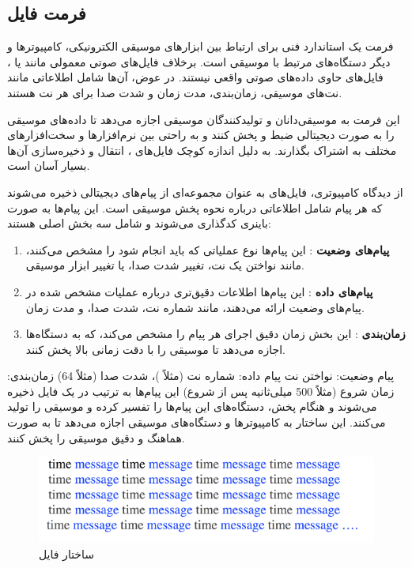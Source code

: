 \subsection{فرمت فایل }

فرمت   \cite{de2017understanding} یک استاندارد فنی برای ارتباط بین ابزارهای موسیقی الکترونیکی، کامپیوترها و دیگر دستگاه‌های مرتبط با موسیقی است. برخلاف فایل‌های صوتی معمولی مانند  یا ، فایل‌های  حاوی داده‌های صوتی واقعی نیستند. در عوض، آن‌ها شامل اطلاعاتی مانند نت‌های موسیقی، زمان‌بندی، مدت زمان و شدت صدا برای هر نت هستند.

این فرمت به موسیقی‌دانان و تولیدکنندگان موسیقی اجازه می‌دهد تا داده‌های موسیقی را به صورت دیجیتالی ضبط و پخش کنند و به راحتی بین نرم‌افزارها و سخت‌افزارهای مختلف به اشتراک بگذارند. به دلیل اندازه کوچک فایل‌های ، انتقال و ذخیره‌سازی آن‌ها بسیار آسان است.

از دیدگاه کامپیوتری، فایل‌های  به عنوان مجموعه‌ای از پیام‌های دیجیتالی ذخیره می‌شوند که هر پیام شامل اطلاعاتی درباره نحوه پخش موسیقی است. این پیام‌ها به صورت باینری کدگذاری می‌شوند و شامل سه بخش اصلی هستند:

\begin{enumerate}
  \def\labelenumi{\arabic{enumi}.}
  \item
        \textbf{پیام‌های وضعیت }: این پیام‌ها نوع عملیاتی که
        باید انجام شود را مشخص می‌کنند، مانند نواختن یک نت، تغییر شدت صدا، یا
        تغییر ابزار موسیقی.
  \item
        \textbf{پیام‌های داده }: این پیام‌ها اطلاعات دقیق‌تری
        درباره عملیات مشخص شده در پیام‌های وضعیت ارائه می‌دهند، مانند شماره نت،
        شدت صدا، و مدت زمان.
  \item
        \textbf{زمان‌بندی }: این بخش زمان دقیق اجرای هر پیام را مشخص
        می‌کند، که به دستگاه‌ها اجازه می‌دهد تا موسیقی را با دقت زمانی بالا پخش
        کنند.
\end{enumerate}

پیام وضعیت: نواختن نت 
پیام داده: شماره نت (مثلاً )، شدت صدا (مثلاً 64)
زمان‌بندی: زمان شروع (مثلاً 500 میلی‌ثانیه پس از شروع)
این پیام‌ها به ترتیب در یک فایل  ذخیره می‌شوند و هنگام پخش، دستگاه‌های  این پیام‌ها را تفسیر کرده و موسیقی را تولید می‌کنند. این ساختار به کامپیوترها و دستگاه‌های موسیقی اجازه می‌دهد تا به صورت هماهنگ و دقیق موسیقی را پخش کنند.

\begin{figure}[!htb]
  \centering
  \includegraphics[scale=1]{Figures/Screenshot 2024-08-29 021655.png}
  \caption{ساختار فایل 
  }
  \label{Fig:MIDI}
\end{figure}


